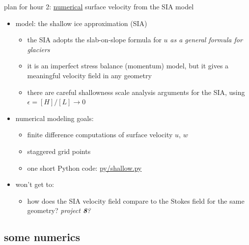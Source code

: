\documentclass[10pt,dvipsnames]{beamer}
\newcommand{\eps}{\epsilon}
\newcommand{\comm}[1]{{\footnotesize \hfill \emph{#1}}}  %
\begin{document}
\begin{frame}{plan for hour 2: \underline{numerical} surface velocity from the SIA model}

\begin{itemize}
\item \alert{model:} the shallow ice approximation (SIA)
  \begin{itemize}
  \item[$\circ$] the SIA adopts the slab-on-slope formula for $u$ \emph{as a general formula for glaciers}
  \item[$\circ$] it is an imperfect stress balance (momentum) model, but it gives a meaningful velocity field in any geometry
  \item[$\circ$] there are careful shallowness scale analysis arguments for the SIA, using $\eps = [H]/[L] \to 0$ \cite{Fowler1997}
  \end{itemize}
\item \alert{numerical modeling goals:}
  \begin{itemize}
  \item[$\circ$] finite difference computations of surface velocity $u$, $w$
  \item[$\circ$] staggered grid points
  \item[$\circ$] one short Python code: \quad \href{https://github.com/bueler/mccarthy/blob/master/py/shallow.py}{py/shallow.py}
  \end{itemize}

\bigskip
\item won't get to:
     \begin{itemize}
     \item[$\circ$] how does the SIA velocity field compare to the Stokes field for the same geometry? \comm{project \textbf{8}?}
     \end{itemize}
\end{itemize}
\end{frame}


\subsection{some numerics}
\end{document}
